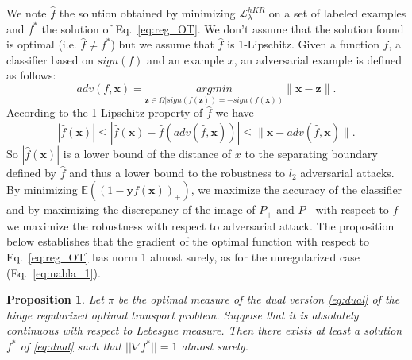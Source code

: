 \documentclass{article}
\newtheorem{Proposition}{Proposition}
\begin{document}
We note $\hat{f}$ the solution obtained by minimizing $\mathcal{L}^{hKR}_\lambda$ on a set of labeled examples and $f^*$ the solution of Eq.~\eqref{eq:reg_OT}. We don't assume that the solution found is optimal (i.e. $\hat{f}\neq f^*$) but we assume that $\hat{f}$ is 1-Lipschitz. Given a function $f$, a classifier based on $sign(f)$ and an example $x$, an adversarial example is defined as follows:
\begin{equation}
    adv(f,\textbf{x})=\underset{\textbf{z}\in \Omega | sign(f(\textbf{z}))=-sign(f(\textbf{x}))}{argmin}\parallel \textbf{x}-\textbf{z}\parallel.
\end{equation}
According to the 1-Lipschitz property of $\hat{f}$ we have 
\begin{equation}
\label{lowerbound}
|\hat{f}(\textbf{x})| \leq |\hat{f}(\textbf{x})-\hat{f}(adv(\hat{f},\textbf{x}))| \leq \parallel \textbf{x}- adv(\hat{f},\textbf{x}) \parallel.
\end{equation}
So $|\hat{f}(\textbf{x})|$ is a lower bound of the distance of $x$ to the separating boundary defined by $\hat{f}$ and thus a lower bound to the robustness to $l_2$ adversarial attacks. By minimizing $\mathbb{E} \left((1-\textbf{y}f(\textbf{x}))_+\right)$, we maximize the accuracy of the classifier and by maximizing the discrepancy of the image of $P_+$ and $P_-$ with respect to $f$ we maximize the robustness with respect to adversarial attack. The proposition below establishes that the gradient of the optimal function with respect to Eq.~\eqref{eq:reg_OT} has norm 1 almost surely, as for the unregularized case (Eq.~\eqref{eq:nabla_1}).
\begin{Proposition}\label{coro_norm1}
Let $\pi$ be the optimal measure of the dual version \eqref{eq:dual} of the hinge regularized optimal transport problem. Suppose that it is absolutely continuous with respect to Lebesgue measure. Then there exists at least a solution $f^*$ of \eqref{eq:dual} such that $||\nabla f^*||=1$ almost surely.
\end{Proposition}
\end{document}
